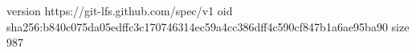 version https://git-lfs.github.com/spec/v1
oid sha256:b840c075da05edffc3c170746314ec59a4cc386dff4c590cf847b1a6ae95ba90
size 987
